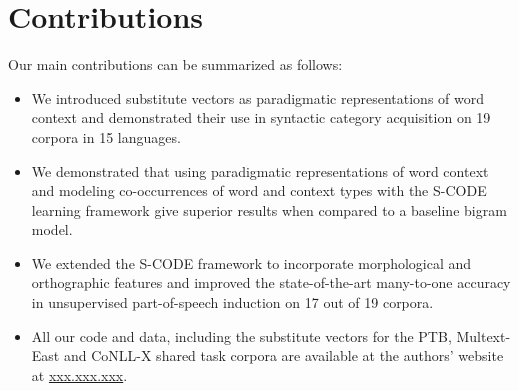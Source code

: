 \section{Contributions}
\label{sec:contrib}

Our main contributions can be summarized as follows:
\begin{itemize}
\item We introduced substitute vectors as paradigmatic representations
  of word context and demonstrated their use in syntactic category
  acquisition on 19 corpora in 15 languages.
\item We demonstrated that using paradigmatic representations of word
  context and modeling co-occurrences of word and context types with
  the S-CODE learning framework give superior results when compared to
  a baseline bigram model.
\item We extended the S-CODE framework to incorporate morphological
  and orthographic features and improved the state-of-the-art
  many-to-one accuracy in unsupervised part-of-speech induction on 17
  out of 19 corpora.
\item All our code and data, including the substitute vectors for the
  PTB, Multext-East and CoNLL-X shared task corpora are available
  at the authors' website at \mbox{\url{xxx.xxx.xxx}}.
\end{itemize}

